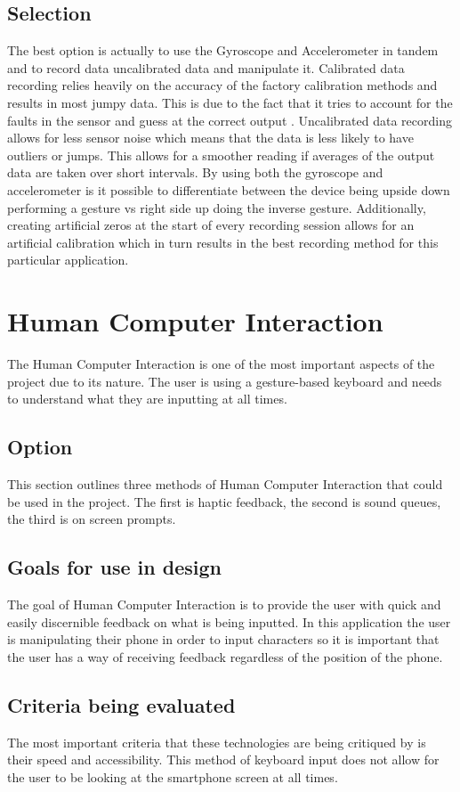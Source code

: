 \documentclass[onecolumn, draftclsnofoot,10pt, journal, letterpaper]{IEEEtran}
\begin{document}
    \subsection{Selection}
        The best option is actually to use the Gyroscope and Accelerometer in tandem and to record data uncalibrated data and manipulate it. Calibrated data recording relies heavily on the accuracy of the factory calibration methods and results in most jumpy data. This is due to the fact that it tries to account for the faults in the sensor and guess at the correct output \cite{Android}. Uncalibrated data recording allows for less sensor noise \cite{RMS} which means that the data is less likely to have outliers or jumps. This allows for a smoother reading if averages of the output data are taken over short intervals. By using both the gyroscope and accelerometer is it possible to differentiate between the device being upside down performing a gesture vs right side up doing the inverse gesture. Additionally, creating artificial zeros at the start of every recording session allows for an artificial calibration which in turn results in the best recording method for this particular application.
        
\section{Human Computer Interaction}
    The Human Computer Interaction is one of the most important aspects of the project due to its nature. The user is using a gesture-based keyboard and needs to understand what they are inputting at all times.
    \subsection{Option}
        This section outlines three methods of Human Computer Interaction that could be used in the project. The first is haptic feedback, the second is sound queues, the third is on screen prompts.
    \subsection{Goals for use in design}
        The goal of Human Computer Interaction is to provide the user with quick and easily discernible feedback on what is being inputted. In this application the user is manipulating their phone in order to input characters so it is important that the user has a way of receiving feedback regardless of the position of the phone.
    \subsection{Criteria being evaluated }
       The most important criteria that these technologies are being critiqued by is their speed and accessibility. This method of keyboard input does not allow for the user to be looking at the smartphone screen at all times. 
\end{document}
